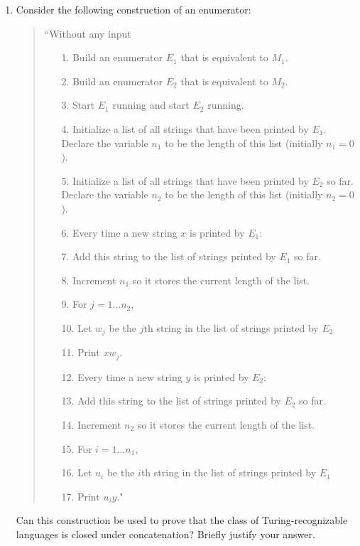 \begin{enumerate}
\begin{enumerate}
    \item Consider the  following construction of an enumerator: 
    \begin{quote}
    ``Without any input
    \begin{itemize}
    \item[1.] Build an enumerator $E_1$ that is equivalent to  $M_1$.
    \item[2.] Build an enumerator $E_2$ that is equivalent to  $M_2$.
    \item[3.] Start $E_1$ running and start $E_2$ running.
    \item[4.] Initialize a list of all strings that have been printed by $E_1$. Declare the variable $n_1$ to be the length of  this  list 
    (initially $n_1 = 0$).
    \item[5.] Initialize a list of all strings that have been printed 
    by $E_2$ so far.
    Declare the variable $n_2$ to be the length of  this  list (initially $n_2 = 0$).
    \item[6.] Every time a new string $x$ is printed by $E_1$: 
    \item[7.] \qquad Add this string to the list of strings printed by $E_1$ so far.
    \item[8.] \qquad Increment $n_1$ so it stores the current length of the list.
    \item[9.] \qquad For $j =  1 \ldots n_2$, 
    \item[10.] \qquad \qquad Let $w_j$ be the $j$th string in the list of strings printed  by  $E_2$
    \item[11.] \qquad \qquad Print $xw_j$.
    \item[12.] Every time a new string $y$ is printed by $E_2$: 
    \item[13.] \qquad Add this string to the list of strings printed by $E_2$ so far.
    \item[14.] \qquad Increment $n_2$ so it stores the current length of the list.
    \item[15.] \qquad For $i =  1 \ldots n_1$, 
    \item[16.] \qquad \qquad Let $u_i$ be the $i$th string in the list of strings printed  by  $E_1$
    \item[17.] \qquad \qquad Print $u_i y$."
    \end{itemize}
    \end{quote}
    
    Can this construction  be  used  to prove that the class  of  Turing-recognizable languages is closed under 
    concatenation? Briefly justify your  answer.
    

\end{enumerate}
\end{enumerate}
